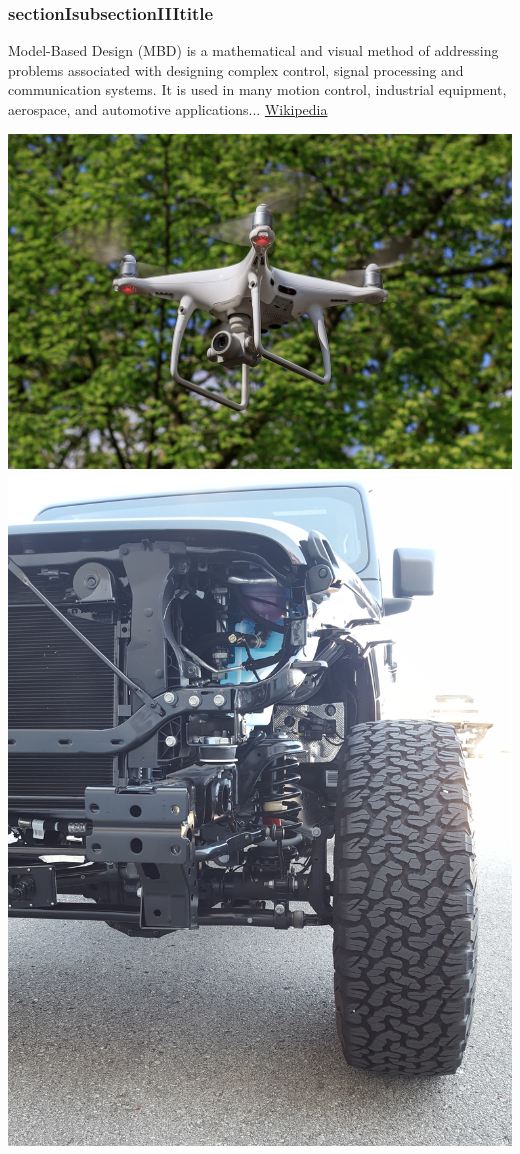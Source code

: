 \documentclass[fleqn]{beamer} %
\begin{document}
			\begin{frame}
				\frametitle{sectionIsubsectionIIItitle}
				\bigskip

				Model-Based Design (MBD) is a mathematical and visual method of addressing problems associated with designing complex control, signal processing and communication systems. It is used in many motion control, industrial equipment, aerospace, and automotive applications... \href{https://en.wikipedia.org/wiki/Model-based_design}{\tiny Wikipedia}

				\includegraphics[scale=.08]{images/dji_phantom_fig2.jpg}\hspccc
				\includegraphics[scale=.025,angle=-90,origin=c]{images/jeep_01.jpg} \hspccc

\end{frame}
\end{document}
